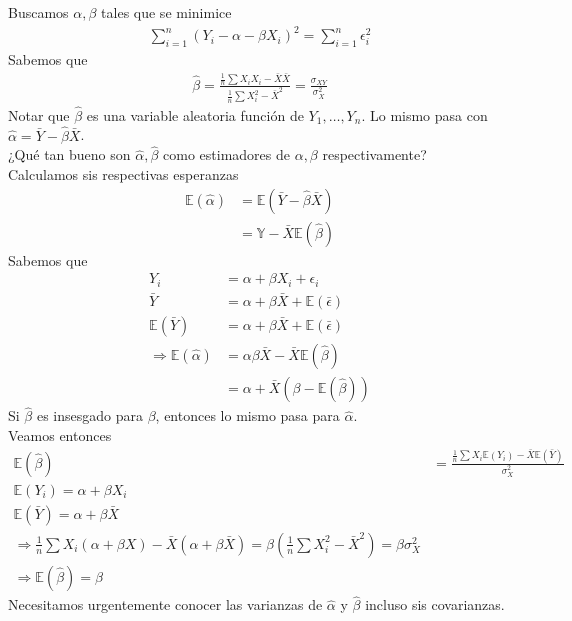 \documentclass[10pt]{article}
\theoremstyle{plain}
\theoremstyle{definition}
\begin{document}
Buscamos $\alpha, \beta$ tales que se minimice
\begin{align*}
\sum_{i=1}^n (Y_{i} - \alpha - \beta X_{i})^2 = \sum_{i=1}^{n} \epsilon_{i}^2
\end{align*}
Sabemos que 
\begin{align*}
\hat{\beta} = \frac{\frac{1}{n}\sum X_{i}X_{i}- \bar{X}\bar{X}}{\frac{1}{n}\sum X_{i}^2 - \bar{X}^2} = \frac{\sigma_{XY}}{\sigma_{X}^2}
\end{align*}
Notar que $\hat{\beta}$ es una variable aleatoria función de $Y_{1},\ldots,Y_{n}$. Lo mismo pasa con $\hat{\alpha} = \bar{Y}-\hat{\beta}\bar{X}$.\\

¿Qué tan bueno son $\hat{\alpha}, \hat{\beta}$ como estimadores de $\alpha,\beta$ respectivamente?\\

Calculamos sis respectivas esperanzas
\begin{align*}
\mathbb{E}(\hat{\alpha}) &= \mathbb{E}(\bar{Y}-\hat{\beta}\bar{X})\\
&= \mathbb{Y}- \bar{X}\mathbb{E}(\hat{\beta})
\end{align*}
Sabemos que
\begin{align*}
Y_{i} &= \alpha + \beta X_{i} + \epsilon_{i}\\
\bar{Y} &= \alpha + \beta \bar{X} + \mathbb{E}(\bar{\epsilon})\\
\mathbb{E}(\bar{Y}) &= \alpha + \beta \bar{X} + \mathbb{E}(\bar{\epsilon})\\
\Rightarrow \mathbb{E}(\hat{\alpha}) &= \alpha \beta \bar{X} - \bar{X}\mathbb{E}(\hat{\beta})\\
&= \alpha + \bar{X}(\beta - \mathbb{E}(\hat{\beta}))
\end{align*}
Si $\hat{\beta}$ es insesgado para $\beta$, entonces lo mismo pasa para $\hat{\alpha}$.\\

Veamos entonces
\begin{align*}
\mathbb{E}(\hat{\beta}) &= \frac{\frac{1}{n}\sum X_{i}\mathbb{E}(Y_{i})- \bar{X}\mathbb{E}(\bar{Y})}{\sigma_{X}^2}\\
\mathbb{E}(Y_{i}) = \alpha + \beta X_{i}\\
\mathbb{E}(\bar{Y}) = \alpha + \beta \bar{X}\\
\Rightarrow \frac{1}{n}\sum X_{i}(\alpha + \beta X)  - \bar{X}(\alpha + \beta\bar{X}) = \beta \left(\frac{1}{n}\sum X_{i}^2 - \bar{X}^2\right) = \beta \sigma_{X}^2\\
\Rightarrow \mathbb{E}(\hat{\beta}) = \beta
\end{align*}
Necesitamos urgentemente conocer las varianzas de $\hat{\alpha}$ y $\hat{\beta}$ incluso sis covarianzas.\\
\end{document}
